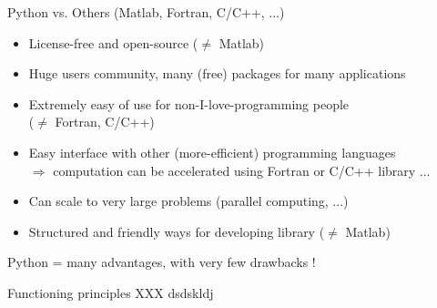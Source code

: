 \documentclass[11pt,unknownkeysallowed,usenames,dvipsnames]{beamer}
\begin{document}
	\begin{frame}{Python vs. Others (Matlab, Fortran, C/C++, ...)}
        \begin{itemize}
            \item License-free and open-source ($\neq$ Matlab)
            \item Huge users community, many (free) packages for many applications
            \item Extremely easy of use for non-I-love-programming people \\ ($\neq$ Fortran, C/C++)
            \item Easy interface with other (more-efficient) programming languages \\
            $\Rightarrow$ computation can be accelerated using Fortran or C/C++
            library ... 
            \item Can scale to very large problems (parallel computing, ...)
            \item Structured and friendly ways for developing library ($\neq$ Matlab)
        \end{itemize}
	
		\vspace{10pt}
	
		\begin{center}
            Python = many advantages, with very few drawbacks !
        \end{center}
	\end{frame}
    
	\begin{frame}{Functioning principles}
        XXX dsdskldj
        
    \end{frame}
\end{document}
